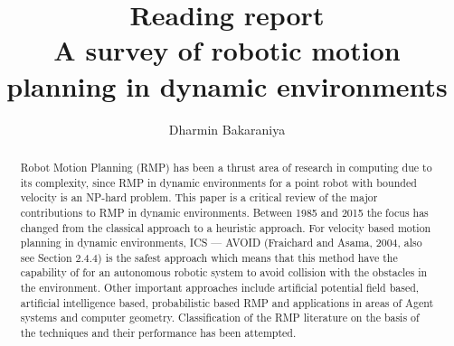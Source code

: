 \documentclass[12pt]{article}
\title{Reading report\\A survey of robotic motion planning in dynamic environments\cite{mohanan2018a}}
\author{Dharmin Bakaraniya}
\begin{document}
\maketitle{}

\begin{abstract}
Robot Motion Planning (RMP) has been a thrust area of research in computing due to its complexity,
since RMP in dynamic environments for a point robot with bounded velocity is an NP-hard problem. This
paper is a critical review of the major contributions to RMP in dynamic environments. Between 1985 and
2015 the focus has changed from the classical approach to a heuristic approach. For velocity based motion
planning in dynamic environments, ICS — AVOID (Fraichard and Asama, 2004, also see Section 2.4.4) is the
safest approach which means that this method have the capability of for an autonomous robotic system
to avoid collision with the obstacles in the environment. Other important approaches include artificial
potential field based, artificial intelligence based, probabilistic based RMP and applications in areas of
Agent systems and computer geometry. Classification of the RMP literature on the basis of the techniques
and their performance has been attempted.
\end{abstract}
\end{document}
